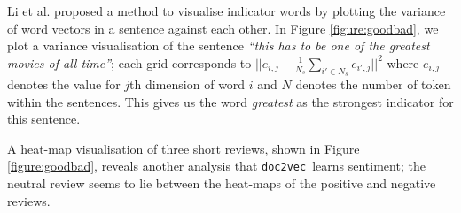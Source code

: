 \documentclass[12pt]{article}
\newcommand{\docvec}{\texttt{doc2vec}}
\begin{document}
\begin{multicols}{2}
Li et al. \cite{li2015visualizing} proposed a method to visualise indicator words by plotting the variance of word vectors in a sentence against each other. In Figure \ref{figure:goodbad}, we plot a variance visualisation of the sentence \emph{``this has to be one of the greatest movies of all time''}; each grid corresponds to $ ||e_{i,j} - \frac{1}{N_{s}} \sum_{i'\in N_{s}}e_{i',j} ||^{2} $ where $e_{i,j}$ denotes the value for $j$th dimension of word $i$ and $N$ denotes the number of token within the sentences. This gives us the word \emph{greatest} as the strongest indicator for this sentence.

A heat-map visualisation of three short reviews, shown in Figure \ref{figure:goodbad}, reveals another analysis that \docvec~learns sentiment; the neutral review seems to lie between the heat-maps of the positive and negative reviews.


\end{multicols}
\end{document}
